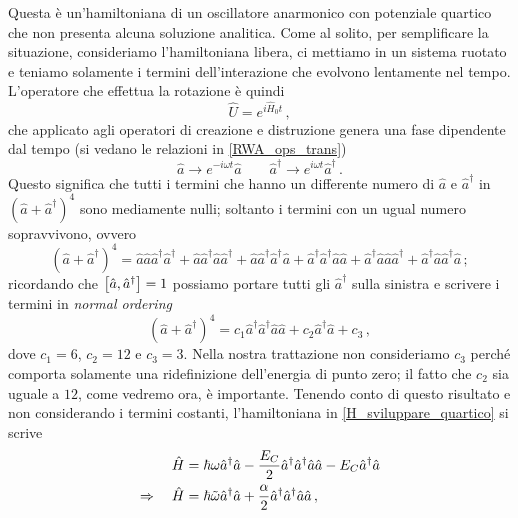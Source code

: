 \noindent Questa è un'hamiltoniana di un oscillatore anarmonico con potenziale quartico che non presenta alcuna soluzione analitica. Come al solito, per semplificare la situazione, consideriamo l'hamiltoniana libera, ci mettiamo in un sistema ruotato e teniamo solamente i termini dell'interazione che evolvono lentamente nel tempo. L'operatore che effettua la rotazione è quindi 
\begin{equation*}
    \hat U = e^{i\hat H_0t} \, ,
\end{equation*}
che applicato agli operatori di creazione e distruzione genera una fase dipendente dal tempo (si vedano le relazioni in \eqref{RWA_ops_trans})
\begin{equation*}
    \hat a \longrightarrow e^{-i\omega t}\hat a \qquad \hat a^\dagger \longrightarrow e^{i\omega t}\hat a^\dagger \, .
\end{equation*}
Questo significa che tutti i termini che hanno un differente numero di $\hat{a}$ e $\hat{a}^\dag$ in $\left(\hat a + \hat a^\dagger\right)^4$ sono mediamente nulli; soltanto i termini con un ugual numero sopravvivono, ovvero
\begin{equation*}
    \left(\hat a + \hat a^\dagger\right)^4 = \hat a\hat a\hat a^\dagger\hat a^\dagger+\hat a\hat a^\dagger\hat a\hat a^\dagger+\hat a\hat a^\dagger\hat a^\dagger\hat a+\hat a^\dagger\hat a^\dagger\hat a\hat a+\hat a^\dagger\hat a\hat a\hat a^\dagger+\hat a^\dagger\hat a\hat a^\dagger\hat a \, ;
\end{equation*}
ricordando che $\comm{\hat a}{\hat a^\dagger}=1$ possiamo portare tutti gli $\hat{a}^\dag$ sulla sinistra e scrivere i termini in \textit{normal ordering}
\begin{equation*}
    \left(\hat a + \hat a^\dagger\right)^4 = c_1\hat a^\dagger \hat a^\dagger\hat a \hat a + c_2\hat a^\dagger \hat a + c_3 \, ,
\end{equation*}
dove $c_1=6$, $c_2=12$ e $c_3=3$. Nella nostra trattazione non consideriamo $c_3$ perché comporta solamente una ridefinizione dell'energia di punto zero; il fatto che $c_2$ sia uguale a $12$, come vedremo ora, è importante. Tenendo conto di questo risultato e non considerando i termini costanti, l'hamiltoniana in \eqref{H_sviluppare_quartico} si scrive
\begin{align}
    \hat H &= \hbar\omega\hat a^\dagger \hat a - \frac{E_C}{2}\hat a^\dagger\hat a^\dagger \hat a \hat a - E_C\hat a^\dagger\hat a \notag \\
    \Rightarrow \quad \hat{H} &= \hbar\tilde{\omega}\hat a^\dagger \hat a + \frac{\alpha}{2}\hat a^\dagger \hat a^\dagger \hat a \hat a \, , \label{final_H_transmon}
\end{align}
